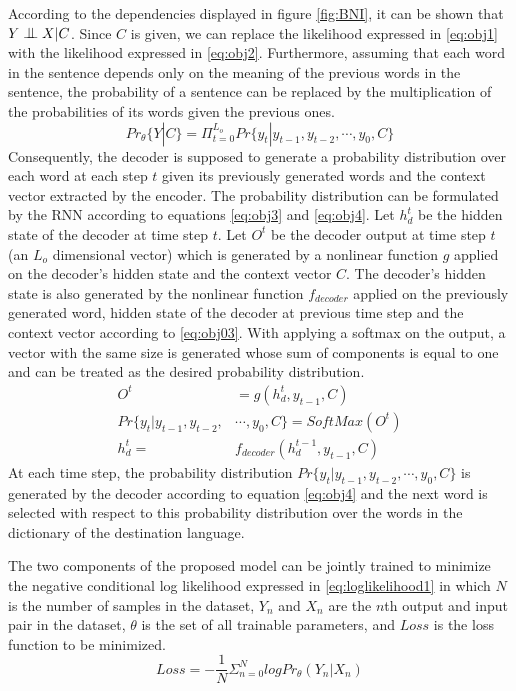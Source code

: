 \documentclass[preprint, 12pt]{elsarticle}
\newcommand{\bigCI}{\mathrel{\text{\scalebox{1.07}{$\perp\mkern-10mu\perp$}}}}
\begin{document}
		 According to the dependencies displayed in figure \ref{fig:BNI}, it can be shown that $Y  \bigCI X | C$. Since $C$ is given, we can replace the likelihood expressed in \eqref{eq:obj1} with the likelihood expressed in \eqref{eq:obj2}. Furthermore, assuming that each word in the sentence depends only on the meaning of the previous words in the sentence, the probability of a sentence can be replaced by the multiplication of the probabilities of its words given the previous ones.
		\begin{equation}
			Pr_\theta\{Y | C\} = \Pi_{t=0}^{L_o} Pr\{y_t| y_{t-1}, y_{t-2}, \cdots, y_0, C\}
			\label{eq:obj2}
		\end{equation}
		Consequently, the decoder is supposed to generate a probability distribution over each word at each step $t$ given its previously generated words and the context vector extracted by the encoder. The probability distribution can be formulated by the RNN according to equations \eqref{eq:obj3} and \eqref{eq:obj4}. Let $h_d^t$ be the hidden state of the decoder at time step $t$. Let $O^t$ be the decoder output at time step $t$ (an $L_o$ dimensional vector) which is generated by a nonlinear function $g$ applied on the decoder's hidden state and the context vector $C$. The decoder's hidden state is also generated by the nonlinear function $f_{decoder}$ applied on the previously generated word, hidden state of the decoder at previous time step and the context vector according to \eqref{eq:obj03}. With applying a softmax on the output, a vector with the same size is generated whose sum of components is equal to one and can be treated as the desired probability distribution.
		\begin{align}
			O^t &= g(h_d^t, y_{t-1}, C) 			\label{eq:obj3}\\
			Pr\{y_t| y_{t-1}, y_{t-2}, &\cdots, y_0, C\} = SoftMax(O^t)
			\label{eq:obj4}\\
			h_d^t = &f_{decoder}(h_d^{t-1}, y_{t-1}, C) \label{eq:obj03} 
		\end{align}
		At each time step, the probability distribution $Pr\{y_t| y_{t-1}, y_{t-2}, \cdots, y_0, C\}$ is generated by the decoder according to equation \eqref{eq:obj4} and the next word is selected with respect to this probability distribution over the words in the dictionary of the destination language.
		
		The two components of the proposed model can be jointly trained to minimize the negative conditional log likelihood expressed in \eqref{eq:loglikelihood1} in which $N$ is the number of samples in the dataset, $Y_n$ and $X_n$ are the $n$th output and input pair in the dataset, $\theta$ is the set of all trainable parameters, and $Loss$ is the loss function to be minimized.
		\begin{equation}
			Loss = -\frac{1}{N} \Sigma_{n=0}^N log Pr_\theta(Y_n | X_n)
			\label{eq:loglikelihood1}
		\end{equation}
		
\end{document}
